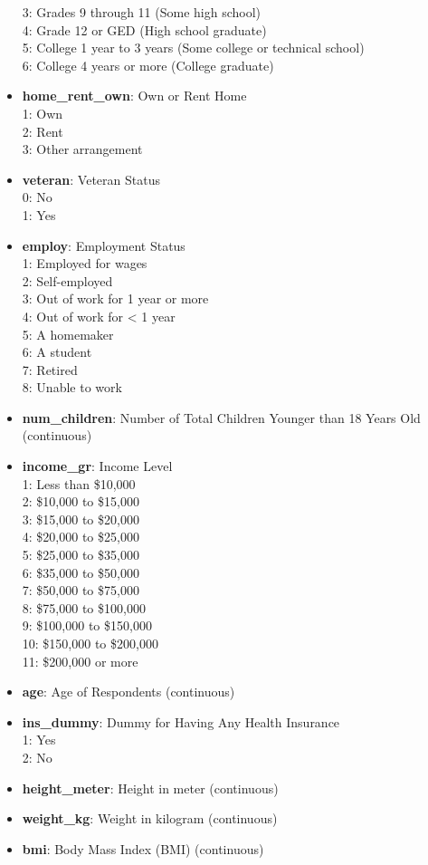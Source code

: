 \documentclass[11pt]{article}
\begin{document}
\begin{itemize}
    3: Grades 9 through 11 (Some high school)\\ 
    4: Grade 12 or GED (High school graduate)\\
    5: College 1 year to 3 years (Some college or technical school) \\
    6: College 4 years or more (College graduate)
    \item \textbf{home\_rent\_own}: Own or Rent Home \\
    1: Own \\
    2: Rent \\
    3: Other arrangement
    \item \textbf{veteran}: Veteran Status \\
    0: No \\
    1: Yes
    \item \textbf{employ}: Employment Status \\
    1: Employed for wages \\
    2: Self-employed \\
    3: Out of work for 1 year or more \\
    4: Out of work for < 1 year \\
    5: A homemaker \\
    6: A student \\
    7: Retired \\
    8: Unable to work
    \item \textbf{num\_children}: Number of Total Children Younger than 18 Years Old (continuous) \\
    \item \textbf{income\_gr}: Income Level \\
    1: Less than \$10,000 \\
    2: \$10,000 to \$15,000 \\
    3: \$15,000 to \$20,000 \\
    4: \$20,000 to \$25,000 \\
    5: \$25,000 to \$35,000 \\
    6: \$35,000 to \$50,000 \\
    7: \$50,000 to \$75,000 \\
    8: \$75,000 to \$100,000 \\
    9: \$100,000 to \$150,000 \\
    10: \$150,000 to \$200,000 \\
    11: \$200,000 or more
    \item \textbf{age}: Age of Respondents (continuous) 
    \item \textbf{ins\_dummy}: Dummy for Having Any Health Insurance \\
    1: Yes \\
    2: No
    
    \item \textbf{height\_meter}: Height in meter (continuous)
    \item \textbf{weight\_kg}: Weight in kilogram (continuous)
    \item \textbf{bmi}: Body Mass Index (BMI) (continuous)
\end{itemize}
\end{document}
